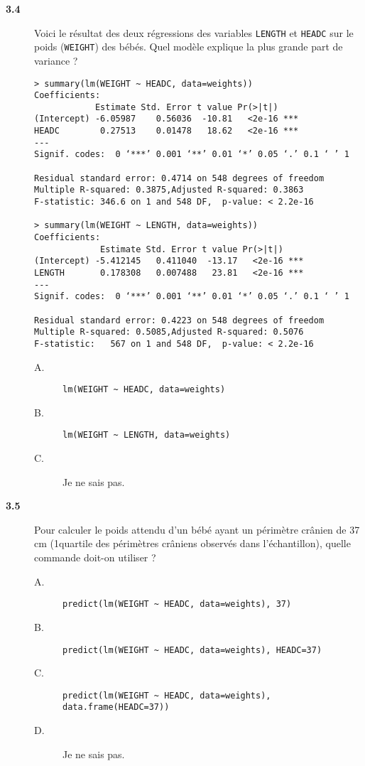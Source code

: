 \documentclass[11pt]{report}
\theoremstyle{definition}
\begin{document}
\begin{description}
\begin{description}
  \end{description}  
\item[\bf 3.4]  Voici le résultat des deux
  régressions des variables \texttt{LENGTH} et \texttt{HEADC} sur le poids
  (\texttt{WEIGHT}) des bébés. Quel modèle explique la plus grande part de
  variance ?  
\begin{verbatim}
> summary(lm(WEIGHT ~ HEADC, data=weights))
Coefficients:
            Estimate Std. Error t value Pr(>|t|)    
(Intercept) -6.05987    0.56036  -10.81   <2e-16 ***
HEADC        0.27513    0.01478   18.62   <2e-16 ***
---
Signif. codes:  0 ‘***’ 0.001 ‘**’ 0.01 ‘*’ 0.05 ‘.’ 0.1 ‘ ’ 1 

Residual standard error: 0.4714 on 548 degrees of freedom
Multiple R-squared: 0.3875,Adjusted R-squared: 0.3863 
F-statistic: 346.6 on 1 and 548 DF,  p-value: < 2.2e-16 

> summary(lm(WEIGHT ~ LENGTH, data=weights))
Coefficients:
             Estimate Std. Error t value Pr(>|t|)    
(Intercept) -5.412145   0.411040  -13.17   <2e-16 ***
LENGTH       0.178308   0.007488   23.81   <2e-16 ***
---
Signif. codes:  0 ‘***’ 0.001 ‘**’ 0.01 ‘*’ 0.05 ‘.’ 0.1 ‘ ’ 1 

Residual standard error: 0.4223 on 548 degrees of freedom
Multiple R-squared: 0.5085,Adjusted R-squared: 0.5076 
F-statistic:   567 on 1 and 548 DF,  p-value: < 2.2e-16 
\end{verbatim}
  \begin{description}
  \item[A.] \verb|lm(WEIGHT ~ HEADC, data=weights)|
  \item[B.] \verb|lm(WEIGHT ~ LENGTH, data=weights)|
  \item[C.] Je ne sais pas.
  \end{description}  
\item[\bf 3.5]  Pour calculer le poids attendu d'un
  bébé ayant un périmètre crânien de 37 cm (1\ier quartile des périmètres
  crâniens observés dans l'échantillon), quelle commande doit-on utiliser ?
  \begin{description}
  \item[A.] \verb|predict(lm(WEIGHT ~ HEADC, data=weights), 37)|
  \item[B.] \verb|predict(lm(WEIGHT ~ HEADC, data=weights), HEADC=37)|
  \item[C.] \verb|predict(lm(WEIGHT ~ HEADC, data=weights), data.frame(HEADC=37))| 
  \item[D.] Je ne sais pas.
  \end{description}  
\end{description}
\end{document}
